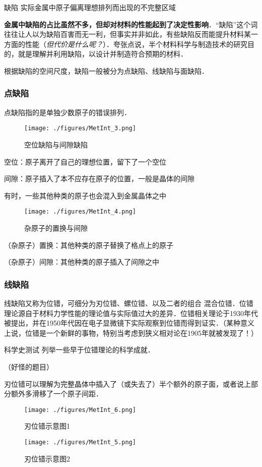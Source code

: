 \begin{definition}{缺陷}
实际金属中原子偏离理想排列而出现的不完整区域
\end{definition}

\textbf{金属中缺陷的占比虽然不多，但却对材料的性能起到了决定性影响}．“缺陷”这个词往往让人以为缺陷百害而无一利，但事实并非如此，有些缺陷反而能提升材料某一方面的性能（\textsl{但代价是什么呢？}）．夸张点说，半个材料科学与制造技术的研究目的，就是理解并利用缺陷，以设计并制造符合预期的材料．

根据缺陷的空间尺度，缺陷一般被分为点缺陷、线缺陷与面缺陷．

\subsubsection{点缺陷}
点缺陷指的是单独少数原子的错误排列．
\begin{figure}[ht]
\centering
\texttt{[image: ./figures/MetInt\_3.png]}
\caption{空位缺陷与间隙缺陷} \label{MetInt_fig3}
\end{figure}
空位：原子离开了自己的理想位置，留下了一个空位

间隙：原子插入了本不应存在原子的位置，一般是晶体的间隙

有时，一些其他种类的原子也会混入到金属晶体之中
\begin{figure}[ht]
\centering
\texttt{[image: ./figures/MetInt\_4.png]}
\caption{杂原子的置换与间隙} \label{MetInt_fig4}
\end{figure}

（杂原子）置换：其他种类的原子替换了格点上的原子

（杂原子）间隙：其他种类的原子插入了间隙之中

\subsubsection{线缺陷}
线缺陷又称为位错，可细分为刃位错、螺位错、以及二者的组合 混合位错．位错理论源自于材料力学性能的理论值与实际值过大的差异．位错相关理论于1930年代被提出，并在1950年代因在电子显微镜下实际观察到位错而得到证实．（某种意义上说，位错是一个新鲜的事物，特别当考虑到狭义相对论在1905年就被发现了！）

\begin{exercise}{科学史测试}
列举一些早于位错理论的科学成就．

（好怪的题目）
\end{exercise}

刃位错可以理解为完整晶体中插入了（或失去了）半个额外的原子面，或者说上部分额外多滑移了一个原子间距．
\begin{figure}[ht]
\centering
\texttt{[image: ./figures/MetInt\_6.png]}
\caption{刃位错示意图1} \label{MetInt_fig6}
\end{figure}
\begin{figure}[ht]
\centering
\texttt{[image: ./figures/MetInt\_5.png]}
\caption{刃位错示意图2} \label{MetInt_fig5}
\end{figure}

